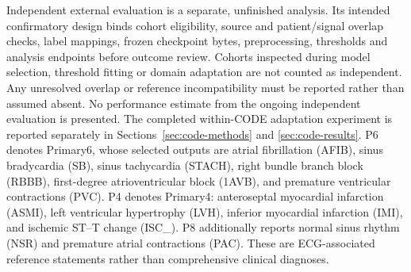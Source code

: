 \documentclass[life,article,submit,moreauthors]{Definitions/mdpi}
\begin{document}
Independent external evaluation is a separate, unfinished analysis. Its intended confirmatory design binds cohort eligibility, source and patient/signal overlap checks, label mappings, frozen checkpoint bytes, preprocessing, thresholds and analysis endpoints before outcome review. Cohorts inspected during model selection, threshold fitting or domain adaptation are not counted as independent. Any unresolved overlap or reference incompatibility must be reported rather than assumed absent. No performance estimate from the ongoing independent evaluation is presented. The completed within-CODE adaptation experiment is reported separately in Sections~\ref{sec:code-methods} and \ref{sec:code-results}.
P6 denotes Primary6, whose selected outputs are atrial fibrillation (AFIB), sinus bradycardia (SB), sinus tachycardia (STACH), right bundle branch block (RBBB), first-degree atrioventricular block (1AVB), and premature ventricular contractions (PVC). P4 denotes Primary4: anteroseptal myocardial infarction (ASMI), left ventricular hypertrophy (LVH), inferior myocardial infarction (IMI), and ischemic ST--T change (ISC\_). P8 additionally reports normal sinus rhythm (NSR) and premature atrial contractions (PAC). These are ECG-associated reference statements rather than comprehensive clinical diagnoses.
\end{document}
